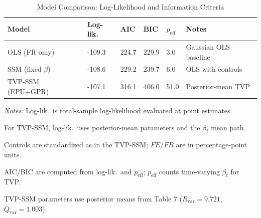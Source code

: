 \begin{table}[!htbp]
\centering
\small
\caption{Model Comparison: Log-Likelihood and Information Criteria}
\label{tab:model_comp}
\begin{threeparttable}
    \begin{tabular}{@{}llllll@{}}
        \toprule
        Model & Log-lik. & AIC & BIC & $p_{\mathrm{eff}}$ & Notes \\
        \midrule
        OLS (FR only) & -109.3 & 224.7 & 229.9 & 3.0 & Gaussian OLS baseline \\
        SSM (fixed $\beta$) & -108.6 & 229.2 & 239.7 & 6.0 & OLS with controls \\
        TVP-SSM (EPU+GPR) & -107.1 & 316.1 & 406.0 & 51.0 & Posterior-mean TVP \\
        \bottomrule
    \end{tabular}
    \begin{tablenotes}[flushleft]
        \footnotesize
        \item \textit{Notes:} Log-lik.\ is total-sample log-likelihood evaluated at point estimates.
        \item For TVP-SSM, log-lik.\ uses posterior-mean parameters and the $\beta_t$ mean path.
        \item Controls are standardized as in the TVP-SSM; $FE$/$FR$ are in percentage-point units.
        \item AIC/BIC are computed from log-lik.\ and $p_{\mathrm{eff}}$; $p_{\mathrm{eff}}$ counts time-varying $\beta_t$ for TVP.
        \item TVP-SSM parameters use posterior means from Table 7 ($R_{\text{var}}=9.721$, $Q_{\text{var}}=1.003$).
    \end{tablenotes}
\end{threeparttable}
\end{table}
